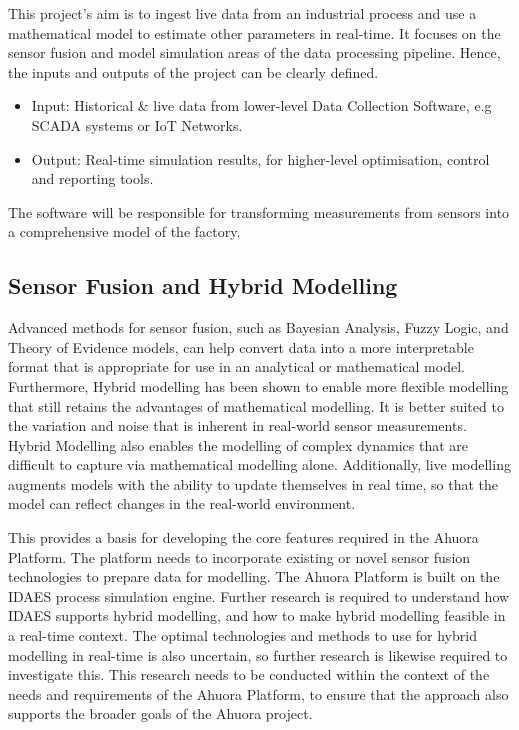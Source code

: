 This project's aim is to ingest live data from an industrial process and use a mathematical model to estimate other parameters in real-time. 
It focuses on the sensor fusion and model simulation areas of the data processing pipeline. Hence, the inputs and outputs of the project can be clearly defined.

\begin{itemize}
    \item Input: Historical \& live data from lower-level Data Collection Software, e.g SCADA systems or IoT Networks.
    \item Output: Real-time simulation results, for higher-level optimisation, control and reporting tools.
\end{itemize}

The software will be responsible for transforming measurements from sensors into a comprehensive model of the factory.

\subsection{Sensor Fusion and Hybrid Modelling}

Advanced methods for sensor fusion, such as Bayesian Analysis, Fuzzy Logic, and Theory of Evidence models, can help convert data into a more interpretable format that is appropriate for use in an analytical or mathematical model. 
Furthermore, Hybrid modelling has been shown to enable more flexible modelling that still retains the advantages of mathematical modelling. 
It is better suited to the variation and noise that is inherent in real-world sensor measurements. 
Hybrid Modelling also enables the modelling of complex dynamics that are difficult to capture via mathematical modelling alone. 
Additionally, live modelling augments models with the ability to update themselves in real time, so that the model can reflect changes in the real-world environment.


This provides a basis for developing the core features required in the Ahuora Platform. The platform needs to incorporate existing or novel sensor fusion technologies to prepare data for modelling. 
The Ahuora Platform is built on the IDAES process simulation engine. Further research is required to understand how IDAES supports hybrid modelling, and how to make hybrid modelling feasible in a real-time context.
The optimal technologies and methods to use for hybrid modelling in real-time is also uncertain, so further research is likewise required to investigate this. 
This research needs to be conducted within the context of the needs and requirements of the Ahuora Platform, to ensure that the approach also supports the broader goals of the Ahuora project.

